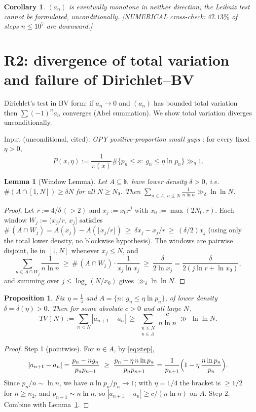 \documentclass[11pt]{article}
\newtheorem{proposition}[theorem]{Proposition}
\newtheorem{lemma}[theorem]{Lemma}
\newtheorem{corollary}[theorem]{Corollary}
\theoremstyle{definition}
\begin{document}
\begin{corollary}
$(a_n)$ is eventually monotone in neither direction; the Leibniz test cannot be formulated, unconditionally. \textnormal{[NUMERICAL cross-check: $42.13\%$ of steps $n\le10^7$ are downward.]}
\end{corollary}

\section{R2: divergence of total variation and failure of Dirichlet--BV}\label{sec:r2}

Dirichlet's test in BV form: if $a_n\to0$ and $(a_n)$ has bounded total variation then $\sum(-1)^na_n$ converges (Abel summation). We show total variation diverges unconditionally.

Input (unconditional, cited): \emph{GPY positive-proportion small gaps} \cite[Theorem~1]{GPY11}: for every fixed $\eta>0$,
\[
P(x,\eta):=\frac{1}{\pi(x)}\#\{p_n\le x:\ g_n\le\eta\ln p_n\}\gg_\eta 1 .
\]

\begin{lemma}[Window Lemma]\label{lem:window}
Let $A\subseteq\mathbb N$ have lower density $\delta>0$, i.e.\ $\#(A\cap[1,N])\ge\delta N$ for all $N\ge N_0$. Then
$\sum_{n\in A,\,n\le N}\frac{1}{n\ln n}\gg_\delta \ln\ln N$.
\end{lemma}
\begin{proof}
Let $r:=4/\delta\,(>2)$ and $x_j:=x_0r^j$ with $x_0:=\max(2N_0,r)$. Each window $W_j:=(x_j/r,\,x_j]$ satisfies
$\#\,(A\cap W_j)=A(x_j)-A(\lfloor x_j/r\rfloor)\ \ge\ \delta x_j-x_j/r\ \ge\ (\delta/2)x_j$
(using only the total lower density, no blockwise hypothesis). The windows are pairwise disjoint, lie in $[1,N]$ whenever $x_j\le N$, and
\[
\sum_{n\in A\cap W_j}\frac{1}{n\ln n}\ \ge\ \#\,(A\cap W_j)\cdot\frac{1}{x_j\ln x_j}\ \ge\ \frac{\delta}{2\ln x_j}
=\frac{\delta}{2(j\ln r+\ln x_0)},
\]
and summing over $j\le\log_r(N/x_0)$ gives $\gg_\delta\ln\ln N$.
\end{proof}

\begin{proposition}\label{prop:tv}
Fix $\eta=\tfrac14$ and $A=\{n:\ g_n\le\eta\ln p_n\}$, of lower density $\delta=\delta(\eta)>0$. Then for some absolute $c>0$ and all large $N$,
\[
TV(N):=\sum_{n<N}|a_{n+1}-a_n|\ \ge\ \sum_{\substack{n\le N\\ n\in A}}\frac{c}{n\ln n}\ \gg\ \ln\ln N .
\]
\end{proposition}
\begin{proof}
Step 1 (pointwise). For $n\in A$, by \eqref{eq:step},
\[
|a_{n+1}-a_n|=\frac{p_n-ng_n}{p_np_{n+1}}\ \ge\ \frac{p_n-\eta\,n\ln p_n}{p_np_{n+1}}
=\frac{1}{p_{n+1}}\Bigl(1-\eta\,\frac{n\ln p_n}{p_n}\Bigr).
\]
Since $p_n/n\sim\ln n$, we have $n\ln p_n/p_n\to1$; with $\eta=1/4$ the bracket is $\ge1/2$ for $n\ge n_2$, and $p_{n+1}\sim n\ln n$, so $|a_{n+1}-a_n|\ge c/(n\ln n)$ on $A$.
Step 2. Combine with Lemma~\ref{lem:window}.
\end{proof}
\end{document}
